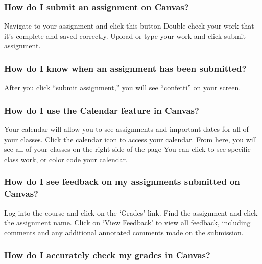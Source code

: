 \hypertarget{how-do-i-submit-an-assignment-on-canvas}{%
\subsubsection{How do I submit an assignment on Canvas?}\label{how-do-i-submit-an-assignment-on-canvas}}

Navigate to your assignment and click this button
Double check your work that it's complete and saved correctly.
Upload or type your work and click submit assignment.

\hypertarget{how-do-i-know-when-an-assignment-has-been-submitted}{%
\subsubsection{How do I know when an assignment has been submitted?}\label{how-do-i-know-when-an-assignment-has-been-submitted}}

After you click ``submit assignment,'' you will see ``confetti'' on your screen.

\hypertarget{how-do-i-use-the-calendar-feature-in-canvas}{%
\subsubsection{How do I use the Calendar feature in Canvas?}\label{how-do-i-use-the-calendar-feature-in-canvas}}

Your calendar will allow you to see assignments and important dates for all of your classes.
Click the calendar icon to access your calendar.
From here, you will see all of your classes on the right side of the page
You can click to see specific class work, or color code your calendar.

\hypertarget{how-do-i-see-feedback-on-my-assignments-submitted-on-canvas}{%
\subsubsection{How do I see feedback on my assignments submitted on Canvas?}\label{how-do-i-see-feedback-on-my-assignments-submitted-on-canvas}}

Log into the course and click on the `Grades' link.
Find the assignment and click the assignment name.
Click on `View Feedback' to view all feedback, including comments and any additional annotated comments made on the submission.

\hypertarget{how-do-i-accurately-check-my-grades-in-canvas}{%
\subsubsection{How do I accurately check my grades in Canvas?}\label{how-do-i-accurately-check-my-grades-in-canvas}}

